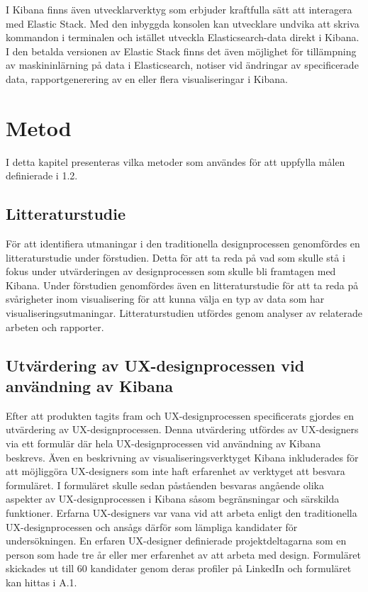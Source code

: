 \documentclass[12pt]{kththesis}
\begin{document}
I Kibana finns även utvecklarverktyg som erbjuder kraftfulla sätt att interagera med Elastic Stack. Med den inbyggda konsolen kan utvecklare undvika att skriva kommandon i terminalen och istället utveckla Elasticsearch-data direkt i Kibana. I den betalda versionen av Elastic Stack finns det även möjlighet för tillämpning av maskininlärning på data i Elasticsearch, notiser vid ändringar av specificerade data, rapportgenerering av en eller flera visualiseringar i Kibana.

\afterpage{\null\newpage}
\chapter{Metod}

I detta kapitel presenteras vilka metoder som användes för att uppfylla målen definierade i 1.2.

\section{Litteraturstudie}

För att identifiera utmaningar i den traditionella designprocessen genomfördes en litteraturstudie under förstudien. Detta för att ta reda på vad som skulle stå i fokus under utvärderingen av designprocessen som skulle bli framtagen med Kibana. Under förstudien genomfördes även en litteraturstudie för att ta reda på svårigheter inom visualisering för att kunna välja en typ av data som har visualiseringsutmaningar. Litteraturstudien utfördes genom analyser av relaterade arbeten och rapporter.

\section{Utvärdering av UX-designprocessen vid användning av Kibana}

Efter att produkten tagits fram och UX-designprocessen specificerats gjordes en utvärdering av UX-designprocessen. Denna utvärdering utfördes av UX-designers via ett formulär där hela UX-designprocessen vid användning av Kibana beskrevs. Även en beskrivning av visualiseringsverktyget Kibana inkluderades för att möjliggöra UX-designers som inte haft erfarenhet av verktyget att besvara formuläret. I formuläret skulle sedan påståenden besvaras angående olika aspekter av UX-designprocessen i Kibana såsom begränsningar och särskilda funktioner. Erfarna UX-designers var vana vid att arbeta enligt den traditionella UX-designprocessen och ansågs därför som lämpliga kandidater för undersökningen. En erfaren UX-designer definierade projektdeltagarna som en person som hade tre år eller mer erfarenhet av att arbeta med design. Formuläret skickades ut till 60 kandidater genom deras profiler på LinkedIn och formuläret kan hittas i A.1.
\end{document}
